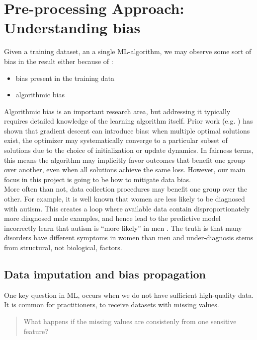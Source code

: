 \documentclass{article}
\newtheorem{hyp}{Hypothesis}
\begin{document}
\section{Pre-processing Approach: Understanding bias}
Given a training dataset, an a single ML-algorithm, we may observe some sort of bias in the result either because of :
\begin{itemize}
    \item bias present in the training data
    \item algorithmic bias
\end{itemize}
Algorithmic bias is an important research area, but addressing it typically requires detailed knowledge of the learning algorithm itself. Prior work (e.g. \cite{pmlr-v99-ji19a}) has shown that gradient descent can introduce bias: when multiple optimal solutions exist, the optimizer may systematically converge to a particular subset of solutions due to the choice of initialization or update dynamics. In fairness terms, this means the algorithm may implicitly favor outcomes that benefit one group over another, even when all solutions achieve the same loss.
However, our main focus in this project is going to be how to mitigate data bias.\\
More often than not, data collection procedures may benefit one group over the other. For example, it is well known that women are less likely to be diagnosed with autism. This creates a loop where available data contain disproportionately more diagnosed male examples, and hence lead to the predictive model incorrectly learn that autism is “more likely” in men . The truth is that many disorders have different symptoms in women than men and under-diagnosis stems from structural, not biological, factors. \\
\subsection{Data imputation and bias propagation}
One key question in ML, occurs when we do not have sufficient high-quality data. It is common for practitioners, to receive datasets with missing values. 
\begin{quote}
  What happens if the missing values are consistenly from one sensitive feature?  
\end{quote}
\end{document}
